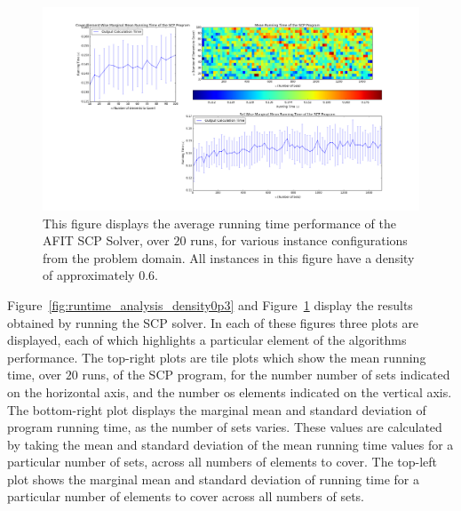 \documentclass[12pt]{article}
\begin{document}
\begin{figure}[ht!] \label{fig:runtime_analysis_density0p6}
	
	
	
	\centering
	\centerline{\includegraphics[width = 6.7in]{running_time_original_density0p6.png}}
	\hfill
	
	\caption{This figure displays the average running time performance of the AFIT SCP Solver, over $20$ runs, for various instance configurations from the problem domain. All instances in this figure have a density of approximately $0.6$.}
	
	
\end{figure}

Figure~\ref{fig:runtime_analysis_density0p3} and Figure~\ref{fig:runtime_analysis_density0p6} display the results obtained by running the SCP solver. In each of these figures three plots are displayed, each of which highlights a particular element of the algorithms performance. The top-right plots are tile plots which show the mean running time, over $20$ runs, of the SCP program, for the number number of sets indicated on the horizontal axis, and the number os elements indicated on the vertical axis. The bottom-right plot displays the marginal mean and standard deviation of program running time, as the number of sets varies. These values are calculated by taking the mean and standard deviation of the mean running time values for a particular number of sets, across all numbers of elements to cover. The top-left plot shows the marginal mean and standard deviation of running time for a particular number of elements to cover across all numbers of sets.
\end{document}
